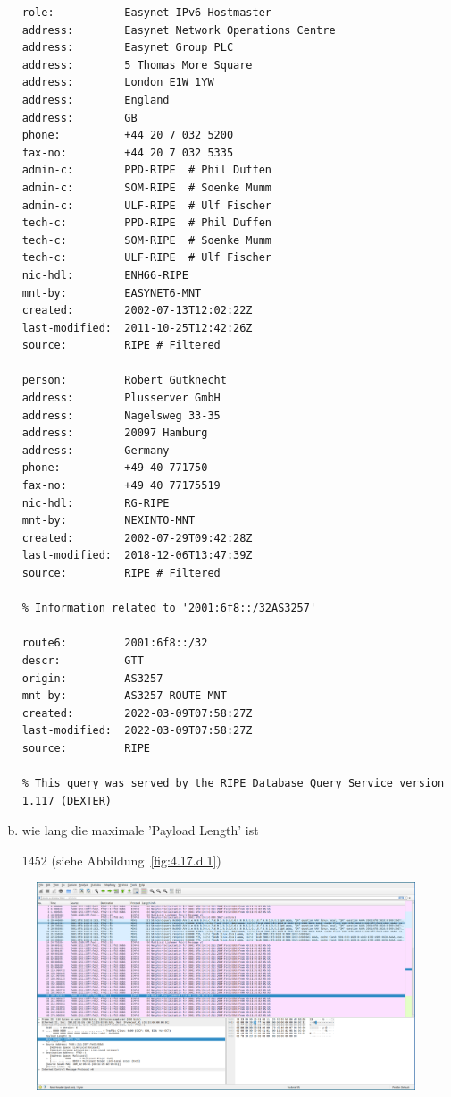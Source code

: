 \begin{enumerate}[(a)]
\begin{verbatim}
role:           Easynet IPv6 Hostmaster
address:        Easynet Network Operations Centre
address:        Easynet Group PLC
address:        5 Thomas More Square
address:        London E1W 1YW
address:        England
address:        GB
phone:          +44 20 7 032 5200
fax-no:         +44 20 7 032 5335
admin-c:        PPD-RIPE  # Phil Duffen
admin-c:        SOM-RIPE  # Soenke Mumm
admin-c:        ULF-RIPE  # Ulf Fischer
tech-c:         PPD-RIPE  # Phil Duffen
tech-c:         SOM-RIPE  # Soenke Mumm
tech-c:         ULF-RIPE  # Ulf Fischer
nic-hdl:        ENH66-RIPE
mnt-by:         EASYNET6-MNT
created:        2002-07-13T12:02:22Z
last-modified:  2011-10-25T12:42:26Z
source:         RIPE # Filtered

person:         Robert Gutknecht
address:        Plusserver GmbH
address:        Nagelsweg 33-35
address:        20097 Hamburg
address:        Germany
phone:          +49 40 771750
fax-no:         +49 40 77175519
nic-hdl:        RG-RIPE
mnt-by:         NEXINTO-MNT
created:        2002-07-29T09:42:28Z
last-modified:  2018-12-06T13:47:39Z
source:         RIPE # Filtered

% Information related to '2001:6f8::/32AS3257'

route6:         2001:6f8::/32
descr:          GTT
origin:         AS3257
mnt-by:         AS3257-ROUTE-MNT
created:        2022-03-09T07:58:27Z
last-modified:  2022-03-09T07:58:27Z
source:         RIPE

% This query was served by the RIPE Database Query Service version 1.117 (DEXTER)
\end{verbatim}

    \item wie lang die maximale 'Payload Length' ist

        1452 (siehe Abbildung~\ref{fig:4.17.d.1})

\end{enumerate}

\begin{figure}[p]
    \centering
    \includegraphics[width=1\textwidth]{./assets/4.17.a.1.png}
    \caption{}
    \label{fig:4.17.a.1}
\end{figure}

